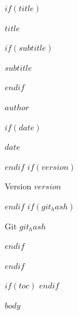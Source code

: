 \documentclass[$if(fontsize)$$fontsize$,$endif$$if(papersize)$$papersize$paper,$endif$article]{article}
\begin{document}
$if(title)$
\begin{titlepage}
  \thispagestyle{empty}
  \begin{center}
    \vspace*{3cm}
    {\Huge\bfseries $title$\par}
    $if(subtitle)$
    \vspace{0.75cm}
    {\Large $subtitle$\par}
    $endif$
    \vspace{2cm}
    {\large $author$\par}
    $if(date)$
    \vspace{0.5cm}
    {\large $date$\par}
    $endif$
    $if(version)$
    \vfill
    {\small Version $version$\par}
    $endif$
    $if(git_hash)$
    {\small Git $git_hash$\par}
    $endif$
  \end{center}
\end{titlepage}
$endif$

$if(toc)$
\tableofcontents
\clearpage
$endif$

$body$
\end{document}
